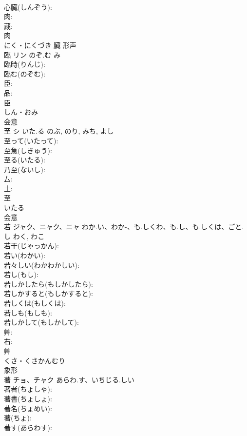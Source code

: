 \documentclass[8pt]{extreport}
\begin{document}
\begin{CJK}{UTF8}{min}
\\	心臓(しんぞう): 
\\	肉: 
\\	蔵: 
\\	肉	
\\	にく・にくづき	臟	形声 
\\	臨	リン	のぞ.む	み	
\\	臨時(りんじ): 
\\	臨む(のぞむ): 
\\	臣: 
\\	品: 
\\	臣	
\\	しん・おみ	
\\	会意 
\\	至	シ	いた.る	のぶ, のり, みち, よし	
\\	至って(いたって): 
\\	至急(しきゅう): 
\\	至る(いたる): 
\\	乃至(ないし): 
\\	厶: 
\\	土: 
\\	至	
\\	いたる	
\\	会意 
\\	若	ジャク、ニャク、ニャ	わか.い、わか-、も.しくわ、も.し、も.しくは、ごと.し	わく, わこ	
\\	若干(じゃっかん): 
\\	若い(わかい): 
\\	若々しい(わかわかしい): 
\\	若し(もし): 
\\	若しかしたら(もしかしたら): 
\\	若しかすると(もしかすると): 
\\	若しくは(もしくは): 
\\	若しも(もしも): 
\\	若しかして(もしかして): 
\\	艸: 
\\	右: 
\\	艸	
\\	くさ・くさかんむり	
\\	象形 
\\	著	チョ、チャク	あらわ.す、いちじる.しい		
\\	著者(ちょしゃ): 
\\	著書(ちょしょ): 
\\	著名(ちょめい): 
\\	著(ちょ): 
\\	著す(あらわす): 

\end{CJK}
\end{document}

